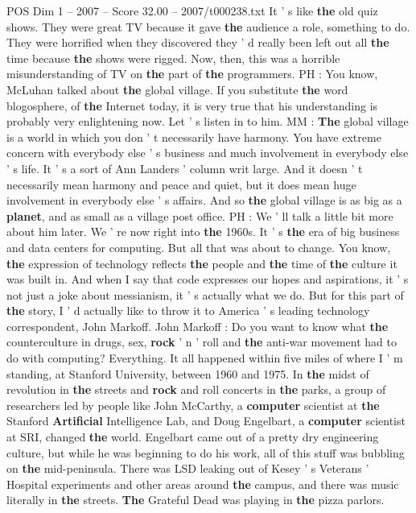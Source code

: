 \begin{textsample}{POS Dim 1 – 2007 – Score 32.00 – 2007/t000238.txt}
It ' s like \textbf{the} old quiz shows.
They were great TV because it gave \textbf{the} audience a role, something to do.
They were horrified when they discovered they ' d really been left out all \textbf{the} time because \textbf{the} shows were rigged.
Now, then, this was a horrible misunderstanding of TV on \textbf{the} part of \textbf{the} programmers.
PH : You know, McLuhan talked about \textbf{the} global village.
If you substitute \textbf{the} word blogosphere, of \textbf{the} Internet today, it is very true that his understanding is probably very enlightening now.
Let ' s listen in to him.
MM : \textbf{The} global village is a world in which you don ' t necessarily have harmony.
You have extreme concern with everybody else ' s business and much involvement in everybody else ' s life.
It ' s a sort of Ann Landers ' column writ large.
And it doesn ' t necessarily mean harmony and peace and quiet, but it does mean huge involvement in everybody else ' s affairs.
And so \textbf{the} global village is as big as a \textbf{planet}, and as small as a village post office.
PH : We ' ll talk a little bit more about him later.
We ' re now right into \textbf{the} 1960s.
It ' s \textbf{the} era of big business and data centers for computing.
But all that was about to change.
You know, \textbf{the} expression of technology reflects \textbf{the} people and \textbf{the} time of \textbf{the} culture it was built in.
And when I say that code expresses our hopes and aspirations, it ' s not just a joke about messianism, it ' s actually what we do.
But for this part of \textbf{the} story, I ' d actually like to throw it to America ' s leading technology correspondent, John Markoff.
John Markoff : Do you want to know what \textbf{the} counterculture in drugs, sex, \textbf{rock} ' n ' roll and \textbf{the} anti-war movement had to do with computing?
Everything.
It all happened within five miles of where I ' m standing, at Stanford University, between 1960 and 1975.
In \textbf{the} midst of revolution in \textbf{the} streets and \textbf{rock} and roll concerts in \textbf{the} parks, a group of researchers led by people like John McCarthy, a \textbf{computer} scientist at \textbf{the} Stanford \textbf{Artificial} Intelligence Lab, and Doug Engelbart, a \textbf{computer} scientist at SRI, changed \textbf{the} world.
Engelbart came out of a pretty dry engineering culture, but while he was beginning to do his work, all of this stuff was bubbling on \textbf{the} mid-peninsula.
There was LSD leaking out of Kesey ' s Veterans ' Hospital experiments and other areas around \textbf{the} campus, and there was music literally in \textbf{the} streets. \textbf{The} Grateful Dead was playing in \textbf{the} pizza parlors.

\end{textsample}
